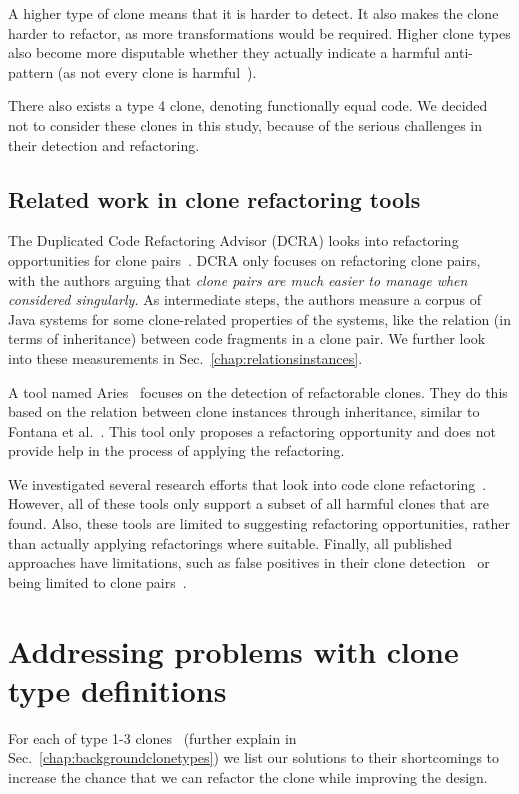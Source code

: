 \documentclass[a4paper]{article}
\begin{document}
A higher type of clone means that it is harder to detect. It also makes the clone harder to refactor, as more transformations would be required. Higher clone types also become more disputable whether they actually indicate a harmful anti-pattern (as not every clone is harmful~\cite{jarzabek2010clones, kapser2008cloning}).

There also exists a type 4 clone, denoting functionally equal code. We decided not to consider these clones in this study, because of the serious challenges in their detection and refactoring.

\subsection{Related work in clone refactoring tools}
The Duplicated Code Refactoring Advisor (DCRA) looks into refactoring opportunities for clone pairs~\cite{fontana2012duplicated, fontana2015duplicated}. DCRA only focuses on refactoring clone pairs, with the authors arguing that \textit{clone pairs are much easier to manage when considered singularly.} As intermediate steps, the authors measure a corpus of Java systems for some clone-related properties of the systems, like the relation (in terms of inheritance) between code fragments in a clone pair. We further look into these measurements in Sec.~\ref{chap:relationsinstances}.

A tool named Aries~\cite{higo2004aries, higo2008metric} focuses on the detection of refactorable clones. They do this based on the relation between clone instances through inheritance, similar to Fontana et al.~\cite{fontana2012duplicated}. This tool only proposes a refactoring opportunity and does not provide help in the process of applying the refactoring.

We investigated several research efforts that look into code clone refactoring~\cite{alwaqfi2017refactoring, chen2018clone, koni2001scenario}. However, all of these tools only support a subset of all harmful clones that are found. Also, these tools are limited to suggesting refactoring opportunities, rather than actually applying refactorings where suitable. Finally, all published approaches have limitations, such as false positives in their clone detection~\cite{chen2018clone} or being limited to clone pairs~\cite{higo2008metric}.

\section{Addressing problems with clone type definitions}\label{chap:clonetypes}
For each of type 1-3 clones~\cite{roy2007survey} (further explain in Sec.~\ref{chap:backgroundclonetypes}) we list our solutions to their shortcomings to increase the chance that we can refactor the clone while improving the design.
\end{document}

